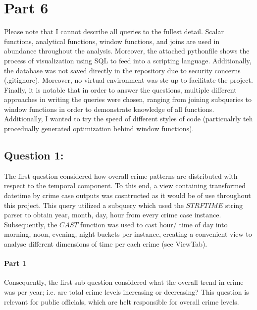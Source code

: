 \documentclass[a4paper]{article}
\begin{document}



\section{Part 6}

Please note that I cannot describe all queries to the fullest detail. Scalar functions, analytical functions, window functions, and joins are used in abundance throughout the analysis. Moreover, the attached pythonfile shows the process of visualization using SQL to feed into a scripting language. 
Additionally, the database was not saved directly in the repository due to security concerns (.gitignore). Moreover, no virtual environment was ste up to facilitate the project. Finally, it is notable that in order to answer the questions, multiple different approaches in writing the queries were chosen, ranging from joining subqueries to window functions in order to demonstrate knowledge of all functions. Additionally, I wanted to try the speed of different styles of code (particualrly teh procedually generated optimization behind window functions).

\subsection{Question 1:}


The first question considered how overall crime patterns are distributed with respect to the temporal component. To this end, a view containing transformed datetime by crime case  outputs was cosntructed as it would be of use throughout this project. This query utilized a subquery which used the $STRFTIME$ string parser to obtain year, month, day, hour from every crime case instance. Subsequently, the $CAST$ function was used to cast hour/ time of day into morning, noon, evening, night buckets per instance, creating a convenient view to analyse different dimensions of time per each crime (see ViewTab).


\paragraph{Part 1} Consequently, the first sub-question considered what the overall trend in crime was per year; i.e. are total crime levels increasing or decreasing? This question is relevant for public officials, which are helt responsible for overall crime levels. 
\end{document}
